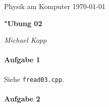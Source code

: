 \documentclass[a4paper,12pt,draft]{article}
\begin{document}
\newcommand{\NAME}{Michael Kopp}
\newcommand{\FACH}{Physik am Komputer}
\newcommand{\TITEL}{"Ubung 02}
\newcommand{\DATUM}{\today}


\pagestyle{plain} 




\sloppy

\begin{center}
\FACH
\hfill
\DATUM
\end{center}

\vspace{-5mm} %

\begin{center}
  \begin{Large}
 \textbf{\TITEL}
  \end{Large}
\end{center}

\vspace{-3mm}

\begin{center}
\hrulefill
\quad 
\textit{\NAME}
\,
\hrulefill
\end{center}
 
 

\noindent

\paragraph{Aufgabe 1}
\label{sec:aufgabe_1}

Siehe \verb+fread03.cpp+.




\paragraph{Aufgabe 2}
\label{sec:aufgabe_2}
\end{document}
